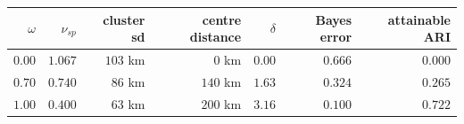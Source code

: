\begin{tabular}{rrrrrrr}
\toprule
$\omega$ & $\nu_{sp}$ & cluster sd & centre distance & $\delta$ & Bayes error & attainable ARI \\
\midrule
$0.00$ & $1.067$ & $103$ km & $0$ km & $0.00$ & $0.666$ & $0.000$ \\
$0.70$ & $0.740$ & $86$ km & $140$ km & $1.63$ & $0.324$ & $0.265$ \\
$1.00$ & $0.400$ & $63$ km & $200$ km & $3.16$ & $0.100$ & $0.722$ \\
\bottomrule
\end{tabular}
